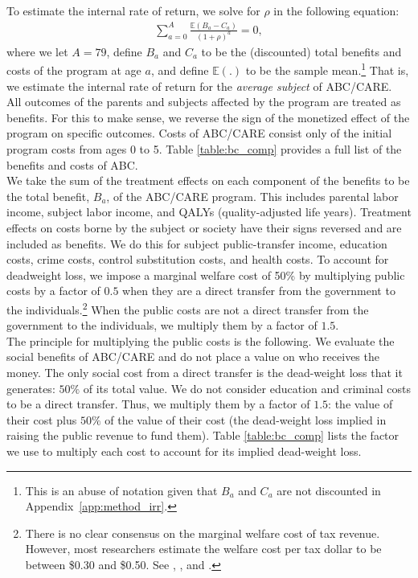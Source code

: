 \noindent To estimate the internal rate of return, we solve for $\rho$ in the following equation:
\begin{align}
\sum_{a=0}^A \frac{ \mathbb{E} (B_a - C_a)}{(1+\rho)^a} = 0,
\end{align}
where we let $A = 79$, define $B_a$ and $C_a$ to be the (discounted) total benefits and costs of the program at age $a$, and define $\mathbb{E}(.)$ to be the sample mean.\footnote{This is an abuse of notation given that $B_a$ and $C_a$ are not discounted in Appendix~\ref{app:method_irr}.} That is, we estimate the internal rate of return for the \textit{average subject} of ABC/CARE. \\

\noindent All outcomes of the parents and subjects affected by the program are treated as benefits. For this to make sense, we reverse the sign of the monetized effect of the program on specific outcomes. Costs of ABC/CARE consist only of the initial program costs from ages 0 to 5. Table \ref{table:bc_comp} provides a full list of the benefits and costs of ABC. \\

\noindent We take the sum of the treatment effects on each component of the benefits to be the total benefit, $B_a$, of the ABC/CARE program. This includes parental labor income, subject labor income, and QALYs (quality-adjusted life years). Treatment effects on costs borne by the subject or society have their signs reversed and are included as benefits. We do this for subject public-transfer income, education costs, crime costs, control substitution costs, and health costs. To account for deadweight loss, we impose a marginal welfare cost of 50\% by multiplying public costs by a factor of $0.5$ when they are a direct transfer from the government to the individuals.\footnote{There is no clear consensus on the marginal welfare cost of tax revenue. However, most researchers estimate the welfare cost per tax dollar to be between \$0.30 and \$0.50. See \citet{Feldstein_1999_REStat}, \citet{Heckman_Smith_1998_evaluating}, and \citet{Browning_1987_AER}.} When the public costs are not a direct transfer from the government to the individuals, we multiply them by a factor of $1.5$.\\

\noindent The principle for multiplying the public costs is the following. We evaluate the social benefits of ABC/CARE and do not place a value on who receives the money. The only social cost from a direct transfer is the dead-weight loss that it generates: $50\%$ of its total value. We do not consider education and criminal costs to be a direct transfer. Thus, we multiply them by a factor of $1.5$: the value of their cost plus $50\%$ of the value of their cost (the dead-weight loss implied in raising the public revenue to fund them). Table \ref{table:bc_comp} lists the factor we use to multiply each cost to account for its implied dead-weight loss.\\

